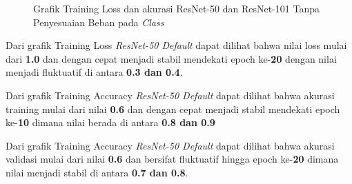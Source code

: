 \begin{figure}[hbtp]
	\centering
	\qquad
	\caption{Grafik Training Loss dan akurasi ResNet-50 dan ResNet-101 Tanpa Penyesuaian Beban pada \emph{Class}}
	\label{Fig:GraphTrainingDefPt2}
\end{figure}
Dari grafik Training Loss \emph{ResNet-50 Default} dapat dilihat bahwa nilai loss mulai dari \textbf{1.0} dan dengan cepat menjadi stabil mendekati epoch ke-\textbf{20} dengan nilai menjadi fluktuatif di antara \textbf{0.3 dan 0.4}.

Dari grafik Training Accuracy \emph{ResNet-50 Default} dapat dilihat bahwa akurasi training mulai dari nilai \textbf{0.6} dan dengan cepat menjadi stabil mendekati epoch ke-\textbf{10} dimana nilai berada di antara \textbf{0.8 dan 0.9} 

Dari grafik Training Accuracy \emph{ResNet-50 Default} dapat dilihat bahwa akurasi validasi mulai dari nilai \textbf{0.6} dan bersifat fluktuatif hingga epoch ke-\textbf{20} dimana nilai menjadi stabil di antara \textbf{0.7 dan 0.8}.

